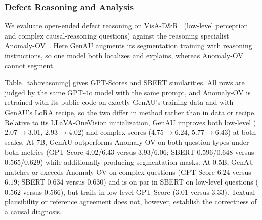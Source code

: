 \subsubsection{Defect Reasoning and Analysis}
We evaluate open-ended defect reasoning on VisA-D\&R~\cite{xu2025towards} (low-level perception and complex causal-reasoning questions) against the reasoning specialist Anomaly-OV~\cite{xu2025towards}. Here GenAU augments its segmentation training with reasoning instructions, so one model both localizes and explains, whereas Anomaly-OV cannot segment.

Table~\ref{tab:reasoning} gives GPT-Scores and SBERT similarities. All rows are judged by the same GPT-4o model with the same prompt, and Anomaly-OV is retrained with its public code on exactly GenAU's training data and with GenAU's LoRA recipe, so the two differ in method rather than in data or recipe. Relative to its LLaVA-OneVision initialization, GenAU improves both low-level ($2.07\!\rightarrow\!3.01$, $2.93\!\rightarrow\!4.02$) and complex scores ($4.75\!\rightarrow\!6.24$, $5.77\!\rightarrow\!6.43$) at both scales. At 7B, GenAU outperforms Anomaly-OV on both question types under both metrics (GPT-Score $4.02$/$6.43$ versus $3.93$/$6.06$; SBERT $0.596$/$0.648$ versus $0.565$/$0.629$) while additionally producing segmentation masks. At 0.5B, GenAU matches or exceeds Anomaly-OV on complex questions (GPT-Score $6.24$ versus $6.19$; SBERT $0.634$ versus $0.630$) and is on par in SBERT on low-level questions ($0.562$ versus $0.566$), but trails in low-level GPT-Score ($3.01$ versus $3.33$).
Textual plausibility or reference agreement does not, however, establish the correctness of a causal diagnosis.

